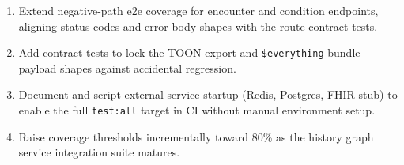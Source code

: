 \begin{enumerate}
    \item Extend negative-path e2e coverage for encounter and condition endpoints,
          aligning status codes and error-body shapes with the route contract tests.
    \item Add contract tests to lock the TOON export and \texttt{\$everything}
          bundle payload shapes against accidental regression.
    \item Document and script external-service startup (Redis, Postgres, FHIR
          stub) to enable the full \texttt{test:all} target in CI without
          manual environment setup.
    \item Raise coverage thresholds incrementally toward 80\% as the history
          graph service integration suite matures.
\end{enumerate}
